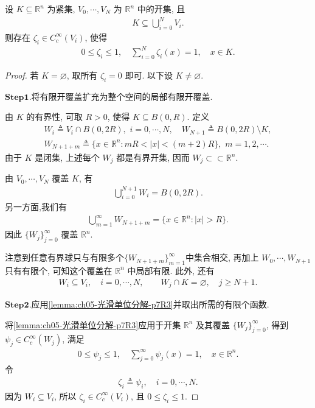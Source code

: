 \documentclass[../../main.tex]{subfiles}
\begin{document}
\begin{corollary}[紧集上的光滑单位分解定理]\label{corollary:紧集上的光滑单位分解定理}
设 $K\subseteq\mathbb{R}^{n}$ 为紧集, $V_0,\cdots,V_N$ 为 $\mathbb{R}^{n}$ 中的开集, 且
\begin{align*}
K\subseteq\bigcup\limits_{i=0}^{N}V_i.
\end{align*}
则存在 $\zeta_i\in C_c^\infty(V_i)$, 使得
\begin{align*}
0\leqslant\zeta_i\leqslant1,\quad
\sum\limits_{i=0}^{N}\zeta_i(x)=1,\quad x\in K.
\end{align*}
\end{corollary}
\begin{proof}

若 $K=\varnothing$, 取所有 $\zeta_i=0$ 即可. 以下设 $K\neq\varnothing$.

\noindent$\mathbf{Step}\mathbf{1}.${\heiti 将有限开覆盖扩充为整个空间的局部有限开覆盖.}

由 $K$ 的有界性, 可取 $R>0$, 使得 $K\subseteq B(0,R)$. 定义
\begin{gather*}
W_i\triangleq V_i\cap B(0,2R),\,\,i=0,\cdots,N,\quad W_{N+1}\triangleq B(0,2R)\setminus K,
\\
W_{N+1+m}\triangleq
\{x\in\mathbb{R}^{n}:mR<|x|<(m+2)R\},\,\, m=1,2,\cdots.
\end{gather*}
由于 $K$ 是闭集, 上述每个 $W_j$ 都是有界开集, 因而 $W_j\subset\subset\mathbb{R}^{n}$.

由 $V_0,\cdots,V_N$ 覆盖 $K$, 有
\begin{align*}
\bigcup\limits_{i=0}^{N+1}W_i=B(0,2R).
\end{align*}
另一方面,我们有
\begin{align*}
\bigcup\limits_{m=1}^{\infty}W_{N+1+m}
=\{x\in\mathbb{R}^{n}:|x|>R\}.
\end{align*}
因此 $\{W_j\}_{j=0}^{\infty}$ 覆盖 $\mathbb{R}^{n}$.

注意到任意有界球只与有限多个$\{W_{N+1+m}\}_{m=1}^{\infty}$中集合相交, 再加上 $W_0,\cdots,W_{N+1}$ 只有有限个, 可知这个覆盖在 $\mathbb{R}^{n}$ 中局部有限. 此外, 还有
\begin{align*}
W_i\subseteq V_i,\quad i=0,\cdots,N,\qquad
W_j\cap K=\varnothing,\quad j\geqslant N+1.
\end{align*}

\noindent$\mathbf{Step}\mathbf{2}.${\heiti 应用\cref{lemma:ch05-光滑单位分解-p7R3}并取出所需的有限个函数.}

将\cref{lemma:ch05-光滑单位分解-p7R3}应用于开集 $\mathbb{R}^{n}$ 及其覆盖 $\{W_j\}_{j=0}^{\infty}$, 得到 $\psi_j\in C_c^\infty(W_j)$, 满足
\begin{align*}
0\leqslant\psi_j\leqslant1,\quad
\sum\limits_{j=0}^{\infty}\psi_j(x)=1,\quad x\in\mathbb{R}^{n}.
\end{align*}
令
\begin{align*}
\zeta_i\triangleq\psi_i,\quad i=0,\cdots,N.
\end{align*}
因为 $W_i\subseteq V_i$, 所以 $\zeta_i\in C_c^\infty(V_i)$, 且 $0\leqslant\zeta_i\leqslant1$.


\end{proof}
\end{document}
